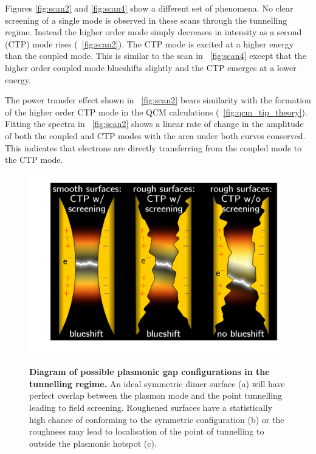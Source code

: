 \documentclass[a4paper]{article}
\begin{document}
Figures \ref{fig:scan2} and \ref{fig:scan4} show a different set of phenomena. No clear screening of a single mode is observed in these scans through the tunnelling regime. Instead the higher order mode simply decreases in intensity as a second (CTP) mode rises (\figurename~\ref{fig:scan2}). The CTP mode is excited at a higher energy than the coupled mode. This is similar to the scan in \figurename~\ref{fig:scan4} except that the higher order coupled mode blueshifts slightly and the CTP emerges at a lower energy.

The power transfer effect shown in \figurename~\ref{fig:scan2} bears similarity with the formation of the higher order CTP mode in the QCM calculations (\figurename~\ref{fig:qcm_tip_theory}). Fitting the spectra in \figurename~\ref{fig:scan2} shows a linear rate of change in the amplitude of both the coupled and CTP modes with the area under both curves conserved. This indicates that electrons are directly transferring from the coupled mode to the CTP mode.

\FloatBarrier
\begin{figure}
\centering
{\includegraphics{figures/tunnelling_plasmonics_diagram}}
{\caption[Diagram of possible plasmonic gap configurations in the tunnelling regime]{\textbf{Diagram of possible plasmonic gap configurations in the tunnelling regime.} An ideal symmetric dimer surface (a) will have perfect overlap between the plasmon mode and the point tunnelling leading to field screening. Roughened surfaces have a statistically high chance of conforming to the symmetric configuration (b) or the roughness may lead to localisation of the point of tunnelling to outside the plasmonic hotspot (c).}
\label{fig:tunnelling_plasmonics_diagram}}
\end{figure}
\end{document}
